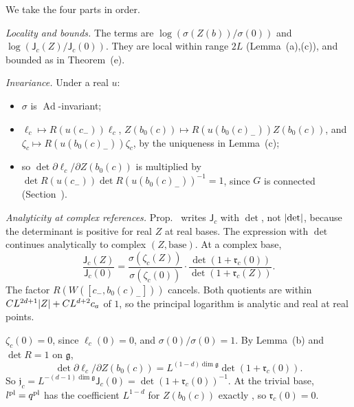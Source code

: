 \begin{detail}\label{xa:d-jac}
We take the four parts in order.
\begin{step}
\emph{Locality and bounds.} The terms are $\log(\sigma(Z(b))/\sigma(0))$ and $\log(\mathsf J_c(Z)/\mathsf J_c(0))$. They are local within range $2L$ (Lemma~(a),(c)), and bounded as in Theorem~(e).

\emph{Invariance.} Under a real $u$:
\begin{itemize}
\item $\sigma$ is $\operatorname{Ad}$-invariant;
\item $\ell_c\mapsto R(u(c_-))\ell_c$, $Z(b_0(c))\mapsto R(u(b_0(c)_-))Z(b_0(c))$, and $\zeta_c\mapsto R(u(b_0(c)_-))\zeta_c$, by the uniqueness in Lemma~(c);
\item so $\det\partial\ell_c/\partial Z(b_0(c))$ is multiplied by $\det R(u(c_-))\det R(u(b_0(c)_-))^{-1}=1$, since $G$ is connected (Section~).
\end{itemize}

\emph{Analyticity at complex references.} Prop.~ writes $\mathsf J_c$ with $\det$, not $\lvert\det\rvert$, because the determinant is positive for real $Z$ at real bases. The expression with $\det$ continues analytically to complex $(Z,\text{base})$. At a complex base,
\[
\frac{\mathsf J_c(Z)}{\mathsf J_c(0)}=\frac{\sigma(\zeta_c(Z))}{\sigma(\zeta_c(0))}\cdot\frac{\det(1+\mathfrak r_c(0))}{\det(1+\mathfrak r_c(Z))}.
\]
The factor $R(W([c_-,b_0(c)_-]))$ cancels. Both quotients are within $CL^{2d+1}\lvert Z\rvert+CL^{d+2}c_a$ of $1$, so the principal logarithm is analytic and real at real points.
\end{step}

\begin{step}[(b)]
$\zeta_c(0)=0$, since $\ell_c(0)=0$, and $\sigma(0)/\sigma(0)=1$. By Lemma~(b) and $\det R=1$ on $\mathfrak g$,
\[
\det\partial\ell_c/\partial Z(b_0(c))=L^{(1-d)\dim\mathfrak g}\det(1+\mathfrak r_c(0)).
\]
So $\mathfrak j_c=L^{-(d-1)\dim\mathfrak g}\mathsf J_c(0)=\det(1+\mathfrak r_c(0))^{-1}$. At the trivial base, $l^{\rm pl}=q^{\rm pl}$ has the coefficient $L^{1-d}$ for $Z(b_0(c))$ exactly , so $\mathfrak r_c(0)=0$.
\end{step}


\end{detail}
